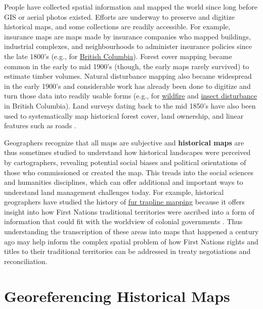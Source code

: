 \documentclass[
]{book}
\begin{document}
People have collected spatial information and mapped the world since long before GIS or aerial photos existed. Efforts are underway to preserve and digitize historical maps, and some collections are readily accessible. For example, insurance maps are maps made by insurance companies who mapped buildings, industrial complexes, and neighbourhoods to administer insurance policies since the late 1800's (e.g., for \href{https://guides.library.ubc.ca/c.php?g=699984&p=4977440}{British Columbia}). Forest cover mapping became common in the early to mid 1900's (though, the early maps rarely survived) to estimate timber volumes. Natural disturbance mapping also became widespread in the early 1900's and considerable work has already been done to digitize and turn those data into readily usable forms (e.g., for \href{https://catalogue.data.gov.bc.ca/dataset/fire-perimeters-historical}{wildfire} and \href{https://catalogue.data.gov.bc.ca/dataset/pest-infestation-polygons-historic}{insect disturbance} in British Columbia). Land surveys dating back to the mid 1850's have also been used to systematically map historical forest cover, land ownership, and linear features such as roads \citep{tomscha_guide_2016}.

Geographers recognize that all maps are subjective and \textbf{historical maps} are thus sometimes studied to understand how historical landscapes were perceived by cartographers, revealing potential social biases and political orientations of those who commissioned or created the map. This treads into the social sciences and humanities disciplines, which can offer additional and important ways to understand land management challenges today. For example, historical geographers have studied the history of \href{https://catalogue.data.gov.bc.ca/dataset/traplines-of-british-columbia}{fur trapline mapping} because it offers insight into how First Nations traditional territories were ascribed into a form of information that could fit with the worldview of colonial governments \citep{iceton_many_2019}. Thus understanding the transcription of these areas into maps that happened a century ago may help inform the complex spatial problem of how First Nations rights and titles to their traditional territories can be addressed in treaty negotiations and reconciliation.

\section{Georeferencing Historical Maps}\label{georeferencing-historical-maps}
\end{document}
